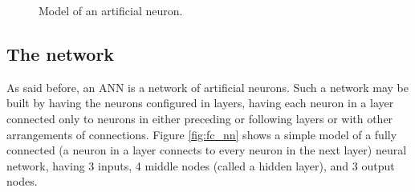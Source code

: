 \begin{figure}[ht]
	\centering
	\caption{Model of an artificial neuron.} \label{fig:neuron}
\end{figure}

\subsection{The network}

As said before, an ANN is a network of artificial neurons. Such a network may be built by having the neurons configured in layers, having each neuron in a layer connected only to neurons in either preceding or following layers or with other arrangements of connections. Figure \ref{fig:fc_nn} shows a simple model of a fully connected (a neuron in a layer connects to every neuron in the next layer) neural network, having 3 inputs, 4 middle nodes (called a hidden layer), and 3 output nodes.


